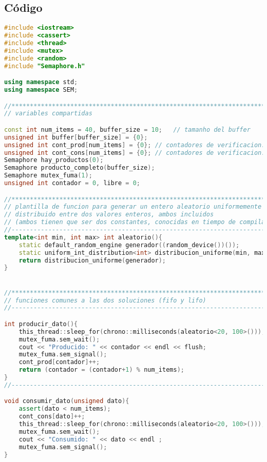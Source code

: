 \documentclass[8pt, a4paper, titlepage]{article}
\begin{document}
   		\subsection{Código}
   		\begin{lstlisting}[language=C++]
#include <iostream>
#include <cassert>
#include <thread>
#include <mutex>
#include <random>
#include "Semaphore.h"

using namespace std;
using namespace SEM;

//**********************************************************************
// variables compartidas

const int num_items = 40, buffer_size = 10;   // tamanho del buffer
unsigned int buffer[buffer_size] = {0};
unsigned int cont_prod[num_items] = {0}; // contadores de verificacion: producidos
unsigned int cont_cons[num_items] = {0}; // contadores de verificacion: consumidos
Semaphore hay_productos(0);
Semaphore producto_completo(buffer_size);
Semaphore mutex_fuma(1);
unsigned int contador = 0, libre = 0;

//**********************************************************************
// plantilla de funcion para generar un entero aleatorio uniformemente
// distribuido entre dos valores enteros, ambos incluidos
// (ambos tienen que ser dos constantes, conocidas en tiempo de compilacion)
//----------------------------------------------------------------------
template<int min, int max> int aleatorio(){
	static default_random_engine generador((random_device())());
	static uniform_int_distribution<int> distribucion_uniforme(min, max) ;
	return distribucion_uniforme(generador);
}


//**********************************************************************
// funciones comunes a las dos soluciones (fifo y lifo)
//----------------------------------------------------------------------

int producir_dato(){
	this_thread::sleep_for(chrono::milliseconds(aleatorio<20, 100>()));
	mutex_fuma.sem_wait();
	cout << "Producido: " << contador << endl << flush;
	mutex_fuma.sem_signal();
	cont_prod[contador]++;
	return (contador = (contador+1) % num_items);
}
//----------------------------------------------------------------------

void consumir_dato(unsigned dato){
	assert(dato < num_items);
	cont_cons[dato]++;
	this_thread::sleep_for(chrono::milliseconds(aleatorio<20, 100>()));
	mutex_fuma.sem_wait();
	cout << "Consumido: " << dato << endl ;
	mutex_fuma.sem_signal();
}



\end{lstlisting}
\end{document}
